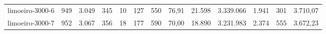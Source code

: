 \begin{table}[ht!]
{\begin{tabular}{lrrrrrrrrrrrr}
			\rowcolor{rowlight}limoeiro-3000-6                                                        & 949 & 3.049 & 345 & 10 & 127 & 550 & 76,91 & 21.598  & 3.339.066  & 1.941 & 301   & 3.710,07 \\
			\rowcolor{rowlight}limoeiro-3000-7                                                        & 952 & 3.067 & 356 & 18 & 177 & 590 & 70,00 & 18.890  & 3.231.983  & 2.374 & 555   & 3.672,23 \\
			\bottomrule
		\end{tabular}%
	}
\end{table}

\begin{table}[ht!]
	\centering
	\caption{Results of the Model \textsc{Path-CBRP-MTZ} with Preprocessing.}
	\label{tab:results-det-path-cbrp-mtz-prep}
\end{table}
